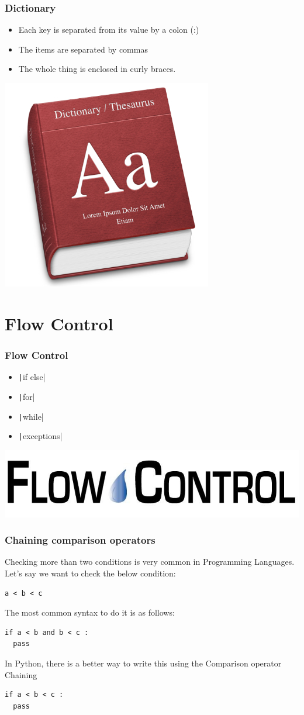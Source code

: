 \documentclass{../py-lecture}
\begin{document}
\begin{frame}
	\frametitle{Dictionary}
  \begin{itemize}
    \item Each key is separated from its value by a colon (:)
    \item The items are separated by commas
    \item The whole thing is enclosed in curly braces.
  \end{itemize}
	\centering\includegraphics[width=.4\textwidth]{img/dictionary.jpg}
\end{frame}

\section{Flow Control}

\begin{frame}
	\frametitle{Flow Control}
  \begin{itemize}
    \item \texttt|if else|
    \item \texttt|for|
    \item \texttt|while|
    \item \texttt|exceptions|
  \end{itemize}
	\centering\includegraphics[width=.4\textwidth]{img/flow-control.jpg}
\end{frame}

\begin{frame}[fragile]
  \frametitle{Chaining comparison operators}
  Checking more than two conditions is very common in Programming Languages. Let’s say we want to check the below condition:
  \begin{verbatim}
a < b < c
  \end{verbatim}
  The most common syntax to do it is as follows:
  \begin{verbatim}
if a < b and b < c :
  pass
  \end{verbatim}
  In Python, there is a better way to write this using the Comparison operator Chaining
  \begin{verbatim}
if a < b < c :
  pass
  \end{verbatim}
\end{frame}
\end{document}
